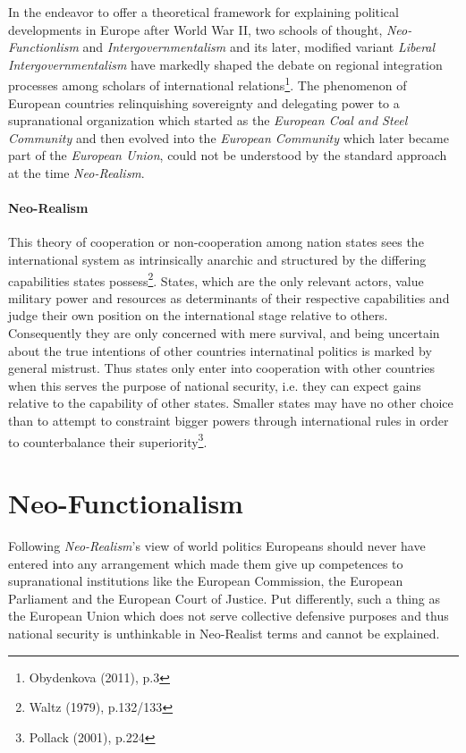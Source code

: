 \documentclass[11pt,a4paper,english]{scrreprt}
\begin{document}
In the endeavor to offer a theoretical framework for explaining political
developments in Europe after World War II, two schools of thought,
\emph{Neo-Functionlism} and \emph{Intergovernmentalism} and its later, modified
variant \emph{Liberal Intergovernmentalism} have markedly shaped the debate on
regional integration processes among scholars of international
relations\footnote{Obydenkova (2011), p.3}. The phenomenon of European countries
relinquishing sovereignty and delegating power to a supranational organization
which started as the \textsl{European Coal and Steel Community} and then evolved
into the \textsl{European Community} which later became part of the
\textsl{European Union}, could not be understood by the standard approach at the
time \emph{Neo-Realism}.\par


      \paragraph{Neo-Realism}

This theory of cooperation or non-cooperation among nation states sees the
international system as intrinsically anarchic and structured by the
differing capabilities states possess\footnote{Waltz (1979), p.132/133}. States,
which are the only relevant actors, value military power and resources as
determinants of their respective capabilities and judge their own position on
the international stage relative to others. Consequently they are only concerned
with mere survival, and being uncertain about the true intentions of other
countries internatinal politics is marked by general mistrust. Thus states
only enter into cooperation with other countries when this serves the purpose
of national security, i.e. they can expect gains relative to the capability of
other states. Smaller states may have no other choice than to attempt to
constraint bigger powers through international rules in order to counterbalance
their superiority\footnote{Pollack (2001), p.224}.\par


   \section{Neo-Functionalism}

Following \emph{Neo-Realism}'s view of world politics Europeans should never
have entered into any arrangement which made them give up competences to
supranational institutions like the European Commission, the European Parliament
and the European Court of Justice. Put differently, such a thing as the European
Union which does not serve collective defensive purposes and thus national
security is unthinkable in Neo-Realist terms and cannot be explained.\par
\end{document}
